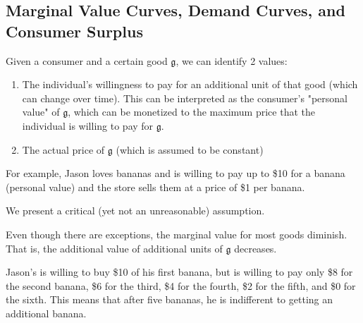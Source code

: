 \documentclass{article}
\begin{document}
  \subsection{Marginal Value Curves, Demand Curves, and Consumer Surplus}

    Given a consumer and a certain good $\mathfrak{g}$, we can identify 2 values: 
    \begin{enumerate}
      \item The individual's willingness to pay for an additional unit of that good (which can change over time). This can be interpreted as the consumer's "personal value" of $\mathfrak{g}$, which can be monetized to the maximum price that the individual is willing to pay for $\mathfrak{g}$. 
      \item The actual price of $\mathfrak{g}$ (which is assumed to be constant)
    \end{enumerate}
    For example, Jason loves bananas and is willing to pay up to \$10 for a banana (personal value) and the store sells them at a price of \$1 per banana. 

    We present a critical (yet not an unreasonable) assumption. 

    \begin{definition}
      Even though there are exceptions, the marginal value for most goods diminish. That is, the additional value of additional units of $\mathfrak{g}$ decreases. 
    \end{definition}

    \begin{example}
      Jason's is willing to buy \$10 of his first banana, but is willing to pay only \$8 for the second banana, \$6 for the third, \$4 for the fourth, \$2 for the fifth, and \$0 for the sixth. This means that after five bananas, he is indifferent to getting an additional banana. 
    \end{example}
\end{document}
